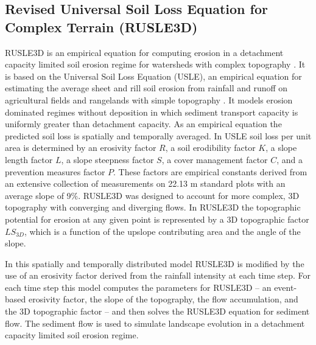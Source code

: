 \documentclass[gmd, manuscript]{copernicus}
\begin{document}
\subsection{Revised Universal Soil Loss Equation for Complex Terrain (RUSLE3D)}
\label{rusle_model}
RUSLE3D
is an empirical equation for computing erosion 
in a detachment capacity limited soil erosion regime
for watersheds with complex topography \citep{Mitasova1996}. 
It is based on 
the Universal Soil Loss Equation (USLE),
an empirical equation for estimating the average
sheet and rill soil erosion from rainfall and runoff
on agricultural fields and rangelands with simple topography 
\citep{Wischmeier1978}. 
It models erosion dominated regimes without deposition
in which sediment transport capacity is 
uniformly greater than detachment capacity.
As an empirical equation the predicted soil loss 
is spatially and temporally averaged. 
In USLE soil loss per unit area is determined by 
an erosivity factor $R$,
a soil erodibility factor $K$, 
a slope length factor $L$,
a slope steepness factor $S$,
a cover management factor $C$,
and a prevention measures factor $P$.
These factors are empirical constants derived 
from an extensive collection of measurements 
on 22.13 \unit{m} standard plots with an average slope of 9$\%$.  
RUSLE3D was designed to account for more complex, 3D topography 
with converging and diverging flows. 
In RUSLE3D the topographic potential for erosion at any given point 
is represented by a 3D topographic factor $LS_{3D}$,
which is a function of the upslope contributing area 
and the angle of the slope. 

In this spatially and temporally distributed model 
RUSLE3D is modified by the use of
an erosivity factor derived from the rainfall intensity 
at each time step.
For each time step
this model computes the parameters for RUSLE3D -- 
an event-based erosivity factor,
the slope of the topography, the flow accumulation, and
the 3D topographic factor -- and then
solves the RUSLE3D equation for sediment flow. 
The sediment flow is used to simulate landscape evolution 
in a detachment capacity limited soil erosion regime.


\end{document}
